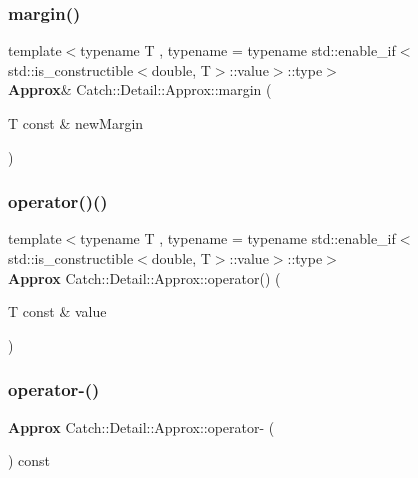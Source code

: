 \subsubsection{margin()}
{\footnotesize\ttfamily template$<$typename T , typename  = typename std\+::enable\+\_\+if$<$std\+::is\+\_\+constructible$<$double, T$>$\+::value$>$\+::type$>$ \\
\textbf{ Approx}\& Catch\+::\+Detail\+::\+Approx\+::margin (\begin{DoxyParamCaption}\item[{T const \&}]{new\+Margin }\end{DoxyParamCaption})\hspace{0.3cm}{\ttfamily [inline]}}

\mbox{\label{class_catch_1_1_detail_1_1_approx_ad8b2757f4804f9a1d3fa674efb98c20e}} 
\subsubsection{operator()()}
{\footnotesize\ttfamily template$<$typename T , typename  = typename std\+::enable\+\_\+if$<$std\+::is\+\_\+constructible$<$double, T$>$\+::value$>$\+::type$>$ \\
\textbf{ Approx} Catch\+::\+Detail\+::\+Approx\+::operator() (\begin{DoxyParamCaption}\item[{T const \&}]{value }\end{DoxyParamCaption})\hspace{0.3cm}{\ttfamily [inline]}}

\mbox{\label{class_catch_1_1_detail_1_1_approx_aa9adf5f05e641df770039543d5067d30}} 
\subsubsection{operator-\/()}
{\footnotesize\ttfamily \textbf{ Approx} Catch\+::\+Detail\+::\+Approx\+::operator-\/ (\begin{DoxyParamCaption}{ }\end{DoxyParamCaption}) const}

\mbox{\label{class_catch_1_1_detail_1_1_approx_a8f4d2def2920a3840d3271f6d9c5ede2}} 
